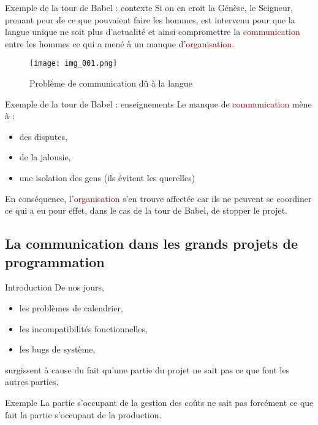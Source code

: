 \documentclass{beamer}
\newcommand{\red}[1]{\textcolor{darkred}{#1}}
\begin{document}
\begin{frame}{Exemple de la tour de Babel : contexte}
Si on en croit la Génèse, le Seigneur, prenant peur de ce que pouvaient faire les hommes, est intervenu pour que la langue unique 
ne soit plus d'actualité et ainsi compromettre la \red{communication} entre les hommes ce qui a mené à un manque 
d'\red{organisation}.

\begin{figure}
	\begin{center}
	\texttt{[image: img\_001.png]}
	\caption{Problème de communication dû à la langue}
	\end{center}	
\end{figure}
\end{frame}

\begin{frame}{Exemple de la tour de Babel : enseignements}
Le manque de \red{communication} mène à :
\begin{itemize}
\pause \item des disputes,
\pause \item de la jalousie,
\pause \item une isolation des gens (ils évitent les querelles)
\end{itemize}
\pause En conséquence, l'\red{organisation} s'en trouve affectée car ils ne peuvent se coordiner ce qui a eu pour effet, dans le 
cas de la tour de Babel, de stopper le projet.
\end{frame}

\subsection{La communication dans les grands projets de programmation}

\begin{frame}{Introduction}
De nos jours, 
\begin{itemize}
\item les problèmes de calendrier,
\item les incompatibilités fonctionnelles,
\item les bugs de système,
\end{itemize}
surgissent à cause du fait qu'une partie du projet ne sait pas ce que font les autres parties.

\begin{exampleblock}{Exemple}
La partie s'occupant de la gestion des coûts ne sait pas forcément ce que fait la partie s'occupant de la production.
\end{exampleblock}
\end{frame}
\end{document}
